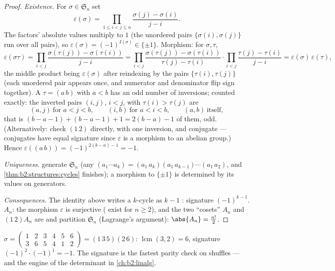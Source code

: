 \begin{proof}
\emph{Existence.} For $\sigma \in \mathfrak{S}_n$ set
\[
\varepsilon(\sigma)
= \prod_{1 \leq i < j \leq n}
\frac{\sigma(j) - \sigma(i)}{j - i} .
\]
The factors' absolute values multiply to $1$ (the unordered pairs
$\{\sigma(i), \sigma(j)\}$ run over all pairs), so
$\varepsilon(\sigma) = (-1)^{I(\sigma)} \in \{\pm1\}$. Morphism: for
$\sigma, \tau$,
\[
\varepsilon(\sigma\tau)
= \prod_{i<j} \frac{\sigma(\tau(j)) - \sigma(\tau(i))}{j - i}
= \prod_{i<j} \frac{\sigma(\tau(j)) - \sigma(\tau(i))}{\tau(j) -
\tau(i)} \cdot \prod_{i<j} \frac{\tau(j) - \tau(i)}{j - i}
= \varepsilon(\sigma)\,\varepsilon(\tau),
\]
the middle product being $\varepsilon(\sigma)$ after reindexing by
the pairs $\{\tau(i), \tau(j)\}$ (each unordered pair appears once,
and numerator and denominator flip sign together). A 
$\tau = (a\,b)$ with $a < b$ has an odd number of inversions;
counted exactly: the inverted pairs $(i, j)$, $i < j$, with
$\tau(i) > \tau(j)$ are
\[
(a, j) \ \text{for } a < j < b, \qquad
(i, b) \ \text{for } a < i < b, \qquad
(a, b) \ \text{itself},
\]
that is $(b - a - 1) + (b - a - 1) + 1 = 2(b - a) - 1$ of them,
odd. (Alternatively: check $(1\,2)$ directly, with one
inversion, and conjugate --- conjugates have equal signature
since $\varepsilon$ is a morphism to an abelian group.) Hence
$\varepsilon((a\,b)) = (-1)^{2(b-a)-1} = -1$.

\emph{Uniqueness.}  generate $\mathfrak{S}_n$ (any
 $(a_1\cdots a_k) = (a_1\,a_k)(a_1\,a_{k-1})\cdots(a_1\,a_2)$,
and \cref{thm:b2:structures:cycles} finishes); a morphism to
$\{\pm1\}$ is determined by its values on generators.

\emph{Consequences.} The  identity above writes a $k$-cycle as
$k - 1$ : signature $(-1)^{k-1}$. $A_n$: the morphism
$\varepsilon$ is surjective ( exist for $n \geq 2$),
and the two ``cosets'' $A_n$ and $(1\,2)A_n$ are  and
partition $\mathfrak{S}_n$ (Lagrange's argument): $\abs{A_n} =
\frac{n!}{2}$.
\end{proof}

\begin{example}\label{ex:b2:structures:snexample}
$\sigma = \begin{pmatrix} 1&2&3&4&5&6\\ 3&6&5&4&1&2 \end{pmatrix}
= (1\,3\,5)(2\,6)$:  $\operatorname{lcm}(3,2) = 6$, signature
$(-1)^{2}\cdot(-1)^{1} = -1$. The signature is the fastest
parity check on shuffles --- and the engine of the determinant in
\cref{ch:b2:linalg}.
\end{example}

